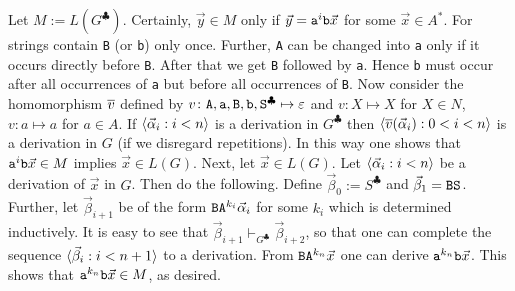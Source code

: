 Let $M := L(G^{\clubsuit})$. Certainly, $\vec{y} \in M$ only if
$\vec{y} = \mbox{\tt a}^i \mbox{\tt b} \vec{x}$ for some
$\vec{x} \in A^{\ast}$. For strings contain {\tt B} (or {\tt b})
only once. Further, {\tt A} can be changed into {\tt a} only if
it occurs directly before {\tt B}. After that we get {\tt B} followed
by {\tt a}. Hence {\tt b} must occur after all occurrences of
{\tt a} but before all occurrences of {\tt B}. Now consider the
homomorphism $\overline{v}$ defined by $v \colon
\mbox{\tt A}, \mbox{\tt a}, \mbox{\tt B}, \mbox{\tt b},
\mbox{\tt S}^{\clubsuit} \mapsto \varepsilon$ and
$v \colon X \mapsto X$ for $X \in N$, $v \colon a \mapsto a$ for
$a \in A$. If $\langle \vec{\alpha}_i : i < n\rangle$ is a
derivation in $G^{\clubsuit}$ then
$\langle \overline{v}(\vec{\alpha}_i) : 0 < i < n\rangle$ is a derivation
in $G$ (if we disregard repetitions).  In this way one shows
that $\mbox{\tt a}^i \mbox{\tt b} \vec{x} \in M$
implies $\vec{x} \in L(G)$. Next, let $\vec{x} \in L(G)$.
Let $\langle \vec{\alpha}_i : i < n\rangle$ be a derivation of
$\vec{x}$ in $G$. Then do the following. Define
$\vec{\beta}_0 := S^{\clubsuit}$ and $\vec{\beta}_1
= \mbox{\tt BS}$. Further, let $\vec{\beta}_{i+1}$ be of the form
$\mbox{\tt BA}^{k_i}\vec{\alpha}_i$ for some $k_i$ which is
determined inductively. It is easy to see that $\vec{\beta}_{i+1}
\vdash_{G^{\clubsuit}} \vec{\beta}_{i+2}$, so that
one can complete the sequence  $\langle \vec{\beta}_i : i < n+1\rangle$
to a derivation. From $\mbox{\tt BA}^{k_n} \vec{x}$ one can derive
$\mbox{\tt a}^{k_n} \mbox{\tt b} \vec{x}$.
This shows that $\mbox{\tt a}^{k_n} \mbox{\tt b} \vec{x} \in M$, 
as desired.
\proofend

